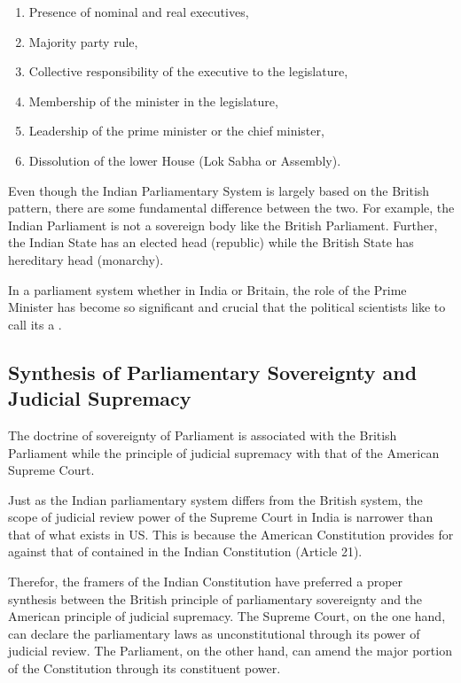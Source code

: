 \renewcommand{\labelenumi}{\textbf{(\alph{enumi})}}
\begin{enumerate}
  \item Presence of nominal and real executives,
  \item Majority party rule,
  \item Collective responsibility of the executive to the legislature,
  \item Membership of the minister in the legislature,
  \item Leadership of the prime minister or the chief minister,
  \item Dissolution of the lower House (Lok Sabha or Assembly).
\end{enumerate}

Even though the Indian Parliamentary System is largely based on the British pattern, there are some fundamental difference between the two. For example, the Indian Parliament is not a sovereign body like the British Parliament. Further, the Indian State has an elected head (republic) while the British State has hereditary head (monarchy).

In a parliament system whether in India or Britain, the role of the Prime Minister has become so significant and crucial that the political scientists like to call its a .

\subsection{Synthesis of Parliamentary Sovereignty and Judicial Supremacy}

The doctrine of sovereignty of Parliament is associated with the British Parliament while the principle of judicial supremacy with that of the American Supreme Court.

Just as the Indian parliamentary system differs from the British system, the scope of judicial review power of the Supreme Court in India is narrower than that of what exists in US. This is because the American Constitution provides for  against that of  contained in the Indian Constitution (Article 21).

Therefor, the framers of the Indian Constitution have preferred a proper synthesis between the British principle of parliamentary sovereignty and the American principle of judicial supremacy. The Supreme Court, on the one hand, can declare the parliamentary laws as unconstitutional through its power of judicial review. The Parliament, on the other hand, can amend the major portion of the Constitution through its constituent power.

